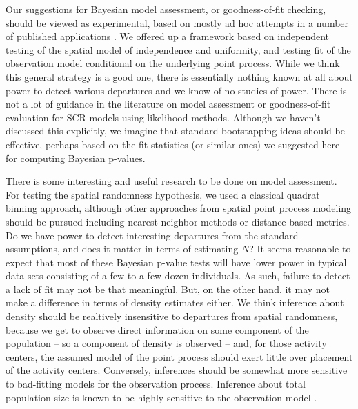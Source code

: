 Our suggestions for Bayesian model assessment, or goodness-of-fit checking, should be viewed as
experimental, based on mostly ad hoc attempts in a number of published
applications \citep[e.g.,]{royle_etal:2009ecol, royle_etal:2011mee}.
We offered up a framework based on independent testing of the spatial
model of independence and uniformity, and testing fit of the
observation model conditional on the underlying point process.  While
we think this general strategy is a good one, there is essentially
nothing known at all about power to detect various departures and we
know of no studies of power.
There is not a lot of guidance in the literature on model assessment
or goodness-of-fit evaluation for SCR models using likelihood
methods. Although we haven't discussed this explicitly, we imagine
that standard bootstapping ideas should be effective, perhaps based on
the fit statistics (or similar ones) we suggested here for computing Bayesian p-values.


There is some interesting and useful research to be done on model
assessment.  For testing the spatial randomness hypothesis, we used a
classical quadrat binning approach, although other approaches from
spatial point process modeling should be pursued including
nearest-neighbor methods or distance-based metrics.  Do we have power
to detect interesting departures from the standard assumptions, and
does it matter in terms of estimating $N$?  It seems reasonable to
expect that most of these Bayesian p-value tests will have lower power
in typical data sets consisting of a few to a few dozen
individuals. As such, failure to detect a lack of fit may not be that
meaningful. But, on the other hand, it may not make a difference in
terms of density estimates either.  
We think
inference about density should be realtively insensitive to departures
from spatial randomness, 
because we get to observe direct
information on some component of the population -- so a component of
density is observed -- and, for those activity centers, the assumed
model of the point process should exert little over placement of the
activity centers.  Conversely, 
inferences should be somewhat more sensitive to
bad-fitting models for the observation process. Inference about total population size
is known to be highly sensitive to the observation model
\citep{dorazio_royle:2003, link:2003}.










